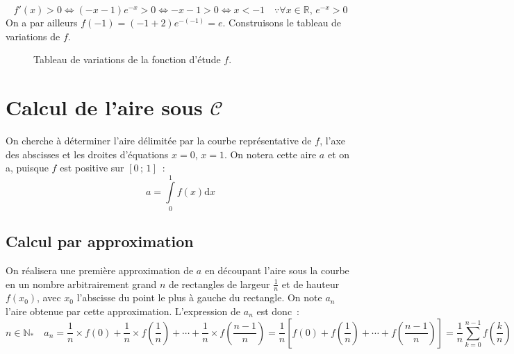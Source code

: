 \documentclass{article}
\begin{document}
    \begin{displaymath}
    f'(x) > 0 \Leftrightarrow (-x-1)e^{-x} > 0 \Leftrightarrow -x-1 > 0\Leftrightarrow x < -1\quad\because\forall x\in\mathbb{R},\, e^{-x} > 0
    \end{displaymath}
        On a par ailleurs $f(-1) = (-1+2)e^{-(-1)} = e$. Construisons le tableau de variations de $f$.
    \begin{figure}[h]
     \begin{center}
     \end{center}
     \caption{Tableau de variations de la fonction d'étude $f$.}
    \end{figure}


\section{Calcul de l'aire sous $\mathscr{C}$}
    On cherche à déterminer l'aire délimitée par la courbe représentative de $f$, l'axe des abscisses et les droites d'équations $x=0$, $x=1$. On notera cette aire $a$ et on a, puisque $f$ est positive sur $[0\,;\,1]$~:
    \begin{displaymath}
     a = \int\limits_0^1 f(x)\mathrm{d}x
    \end{displaymath}

\subsection{Calcul par approximation}
    On réalisera une première approximation de $a$ en découpant l'aire sous la courbe en un nombre arbitrairement grand $n$ de rectangles de largeur $\frac{1}{n}$ et de hauteur $f(x_0)$, avec $x_0$ l'abscisse du point le plus à gauche du rectangle. On note $a_n$ l'aire obtenue par cette approximation. L'expression de $a_n$ est donc~:
    \begin{displaymath}
     n\in\mathbb{N}_*\quad a_n = \frac{1}{n}\times f(0) +\frac{1}{n}\times f\!\left(\frac{1}{n}\right)+\dotsb+\frac{1}{n}\times f\!\left(\frac{n-1}{n}\right)=\frac{1}{n}\left[f(0)+f\!\left(\frac{1}{n}\right)+\dotsb +f\!\left(\frac{n-1}{n}\right)\right]
     =\frac{1}{n}\sum_{k=0}^{n-1} f\!\left(\frac{k}{n}\right)
    \end{displaymath}
\end{document}
